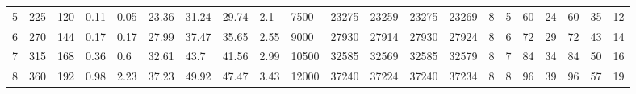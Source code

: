 \begin{longtable}{lllllllllllllllllllll}
\cline{1-21} \cline{2-21}
5 & 225 & 120 & \num{0.11} & \num{0.05} & \num{23.36} & \num{31.24} & \num{29.74} & \num{2.1} & \num{7500} & \num{23275} & \num{23259} & \num{23275} & \num{23269} & \num{8} & \num{5} & \num{60} & \num{24} & \num{60} & \num{35} & \num{12} \\
\cline{1-21} \cline{2-21}
6 & 270 & 144 & \num{0.17} & \num{0.17} & \num{27.99} & \num{37.47} & \num{35.65} & \num{2.55} & \num{9000} & \num{27930} & \num{27914} & \num{27930} & \num{27924} & \num{8} & \num{6} & \num{72} & \num{29} & \num{72} & \num{43} & \num{14} \\
\cline{1-21} \cline{2-21}
7 & 315 & 168 & \num{0.36} & \num{0.6} & \num{32.61} & \num{43.7} & \num{41.56} & \num{2.99} & \num{10500} & \num{32585} & \num{32569} & \num{32585} & \num{32579} & \num{8} & \num{7} & \num{84} & \num{34} & \num{84} & \num{50} & \num{16} \\
\cline{1-21} \cline{2-21}
8 & 360 & 192 & \num{0.98} & \num{2.23} & \num{37.23} & \num{49.92} & \num{47.47} & \num{3.43} & \num{12000} & \num{37240} & \num{37224} & \num{37240} & \num{37234} & \num{8} & \num{8} & \num{96} & \num{39} & \num{96} & \num{57} & \num{19} \\
\cline{1-21} \cline{2-21}
\end{longtable}
